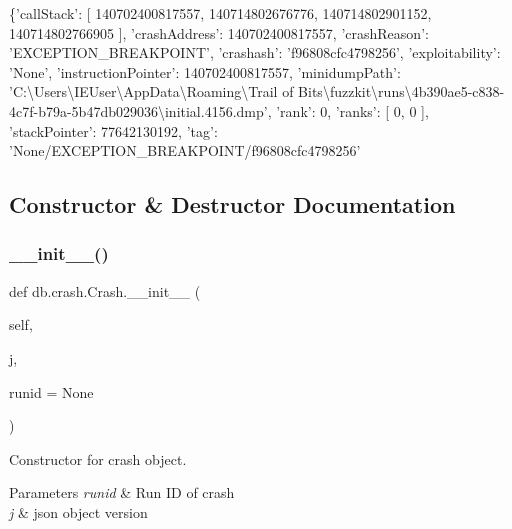 \begin{DoxyPre}
 \{'callStack': [
         140702400817557,
         140714802676776,
         140714802901152,
         140714802766905
     ],
     'crashAddress': 140702400817557,
     'crashReason': 'EXCEPTION\_BREAKPOINT',
     'crashash': 'f96808cfc4798256',
     'exploitability': 'None',
     'instructionPointer': 140702400817557,
     'minidumpPath': 'C:\textbackslash{}Users\textbackslash{}IEUser\textbackslash{}AppData\textbackslash{}Roaming\textbackslash{}Trail of Bits\textbackslash{}fuzzkit\textbackslash{}runs\textbackslash{}4b390ae5-c838-4c7f-b79a-5b47db029036\textbackslash{}initial.4156.dmp',
     'rank': 0,
     'ranks': [
         0,
         0
     ],
     'stackPointer': 77642130192,
     'tag': 'None/EXCEPTION\_BREAKPOINT/f96808cfc4798256'
 \end{DoxyPre}
 

\subsection{Constructor \& Destructor Documentation}
\mbox{\label{classdb_1_1crash_1_1_crash_a942b4146c30dc12dd352b600a9f0a8ba}} 
\subsubsection{\texorpdfstring{\+\_\+\+\_\+init\+\_\+\+\_\+()}{\_\_init\_\_()}}
{\footnotesize\ttfamily def db.\+crash.\+Crash.\+\_\+\+\_\+init\+\_\+\+\_\+ (\begin{DoxyParamCaption}\item[{}]{self,  }\item[{}]{j,  }\item[{}]{runid = {\ttfamily None} }\end{DoxyParamCaption})}



Constructor for crash object. 


\begin{DoxyParams}{Parameters}
{\em runid} & Run ID of crash \\
\hline
{\em j} & json object version \\
\hline
\end{DoxyParams}


